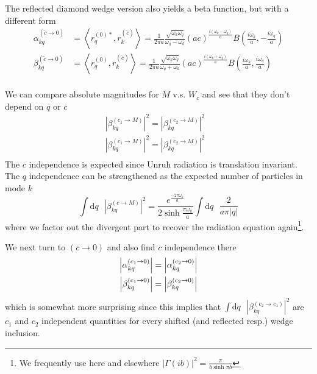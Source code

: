 \documentclass[12pt,a4paper]{article}
\newcommand{\dv}[1]{\mathrm{d} #1 \text{ }}
\begin{document}
The reflected diamond wedge version also yields a beta function, but with a different form
\begin{equation}
  \begin{aligned}
    \alpha^{(\widetilde{c} \rightarrow 0)}_{kq}     &= \left<r_q^{(0)*}, r_k^{(\widetilde{c})} \right> = \frac{1}{2 \pi a}\frac{\sqrt{\omega_k \omega_q}}{\omega_q - \omega_k} (ac)^{\frac{i(\omega_k - \omega_q)}{a}} B\left(\frac{i\omega_k}{a}, -\frac{i\omega_q}{a}\right) \\
    \beta^{(\widetilde{c} \rightarrow 0)}_{kq} &= \left<r_q^{(0)}, r_k^{(\widetilde{c})} \right> = \frac{1}{2 \pi a}\frac{\sqrt{\omega_k \omega_q}}{\omega_q + \omega_k} (ac)^{\frac{i(\omega_k + \omega_q)}{a}} B\left(\frac{i\omega_k}{a}, \frac{i\omega_q}{a}\right) \\
  \end{aligned}
  \label{bogo2}
\end{equation}


We can compare absolute magnitudes for $M$ v.s. $W_c$ and see that they don't depend on $q$ or $c$
\begin{equation}
  \begin{array}{cc}
    \left|\beta_{kq}^{(c_1 \rightarrow M)}\right|^2 = \left|\beta_{kq}^{(c_2 \rightarrow M)}\right|^2 & \\
    \left|\beta_{kq}^{(c_1 \rightarrow M)}\right|^2 = \left|\beta_{kq}^{(c_2 \rightarrow M)}\right|^2 & \\
 \end{array}
\end{equation}
The $c$ independence is expected since Unruh radiation is translation invariant. The $q$ independence can be strengthened as the expected number of particles in mode $k$
\begin{equation}
 \int \dv{q} \left|\beta_{kq}^{(c \rightarrow M)}\right|^2 = \frac{e^{\frac{-2 \pi \omega_k}{a}}}{2 \sinh \frac{\pi \omega_k}{a}} \int \dv{q} \frac{2}{a\pi |q|}
\end{equation}
where we factor out the divergent part to recover the radiation equation again\footnote{We frequently use here and elsewhere $|\Gamma(ib)|^2 = \frac{\pi}{b \sinh \pi b}$}.

We next turn to $(c \rightarrow 0)$ and also find $c$ independence there 
\begin{equation}
  \begin{array}{c}
    \left|\alpha_{kq}^{(c_1 \rightarrow 0)}\right| = \left|\alpha_{kq}^{(c_2 \rightarrow 0)}\right| \vspace{4pt} \\
    \left|\beta_{kq}^{(c_1 \rightarrow 0)}\right| = \left|\beta_{kq}^{(c_2 \rightarrow 0)}\right| \\
  \end{array}
\end{equation}
which is somewhat more surprising since this implies that $\int \dv{q} \left|\beta_{kq}^{(c_2 \rightarrow c_1)}\right|^2$ are $c_1$ and $c_2$ independent quantities for every shifted (and reflected resp.) wedge inclusion.
\end{document}
